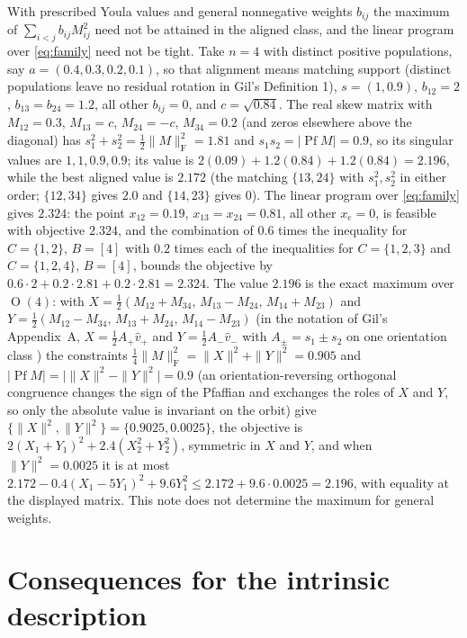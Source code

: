 \documentclass[11pt]{article}
\newcommand{\F}{\mathrm F}
\DeclareMathOperator{\Orth}{O}
\begin{document}
\begin{remark}\label{rem:nonproduct}
With prescribed Youla values and general nonnegative weights $b_{ij}$ the
maximum of $\sum_{i<j}b_{ij}M_{ij}^2$ need not be attained in the aligned
class, and the linear program over \eqref{eq:family} need not be tight. Take
$n=4$ with distinct positive populations, say $a=(0.4,0.3,0.2,0.1)$, so that
alignment means matching support (distinct populations leave no residual
rotation in Gil's Definition 1), $s=(1,0.9)$, $b_{12}=2$, $b_{13}=b_{24}=1.2$,
all other $b_{ij}=0$, and $c=\sqrt{0.84}$. The real skew matrix with
$M_{12}=0.3$, $M_{13}=c$, $M_{24}=-c$, $M_{34}=0.2$ (and zeros elsewhere above
the diagonal) has $s_1^2+s_2^2=\tfrac12\|M\|_\F^2=1.81$ and
$s_1s_2=|\operatorname{Pf}M|=0.9$, so its singular values are $1,1,0.9,0.9$;
its value is $2(0.09)+1.2(0.84)+1.2(0.84)=2.196$, while the best aligned value
is $2.172$ (the matching $\{13,24\}$ with $s_1^2,s_2^2$ in either order;
$\{12,34\}$ gives $2.0$ and $\{14,23\}$ gives $0$). The linear program over
\eqref{eq:family} gives $2.324$: the point $x_{12}=0.19$, $x_{13}=x_{24}=0.81$,
all other $x_e=0$, is feasible with objective $2.324$, and the combination of
$0.6$ times the inequality for $C=\{1,2\}$, $B=[4]$ with $0.2$ times each of
the inequalities for $C=\{1,2,3\}$ and $C=\{1,2,4\}$, $B=[4]$, bounds the
objective by $0.6\cdot2+0.2\cdot2.81+0.2\cdot2.81=2.324$. The value $2.196$
is the exact maximum over $\Orth(4)$: with
$X=\tfrac12(M_{12}+M_{34},\,M_{13}-M_{24},\,M_{14}+M_{23})$ and
$Y=\tfrac12(M_{12}-M_{34},\,M_{13}+M_{24},\,M_{14}-M_{23})$ (in the notation
of Gil's Appendix~A, $X=\tfrac12A_+\hat v_+$ and $Y=\tfrac12A_-\hat v_-$ with
$A_\pm=s_1\pm s_2$ on one orientation class \cite[eqs.~(A3)--(A6)]{gil}) the
constraints
$\tfrac14\|M\|_\F^2=\|X\|^2+\|Y\|^2=0.905$ and
$|\operatorname{Pf}M|=\bigl|\|X\|^2-\|Y\|^2\bigr|=0.9$ (an orientation-reversing
orthogonal congruence changes the sign of the Pfaffian and exchanges the
roles of $X$ and $Y$, so only the absolute value is invariant on the orbit)
give $\{\|X\|^2,\|Y\|^2\}=\{0.9025,0.0025\}$, the objective is
$2(X_1+Y_1)^2+2.4(X_2^2+Y_2^2)$, symmetric in $X$ and $Y$, and when
$\|Y\|^2=0.0025$ it is at most
$2.172-0.4(X_1-5Y_1)^2+9.6Y_1^2\le2.172+9.6\cdot0.0025=2.196$, with equality
at the displayed matrix. This note does not determine the maximum for general weights.
\end{remark}

\section{Consequences for the intrinsic description}
\end{document}
